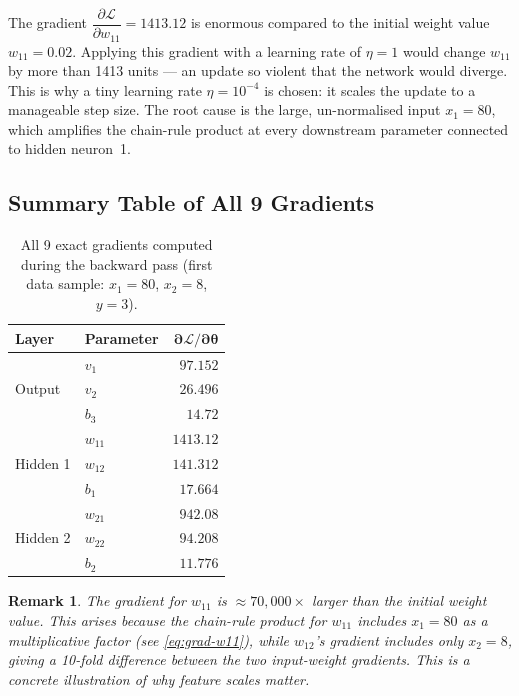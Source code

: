 \documentclass[12pt,a4paper]{article}
\newtheorem{remark}{Remark}[section]
\newcommand{\Loss}{\mathcal{L}}
\newcommand{\pderiv}[2]{\dfrac{\partial #1}{\partial #2}}
\begin{document}
\begin{warningbox}
The gradient $\pderiv{\Loss}{w_{11}} = 1413.12$ is enormous compared to the
initial weight value $w_{11}=0.02$.  Applying this gradient with a learning
rate of $\eta = 1$ would change $w_{11}$ by more than 1413 units --- an
update so violent that the network would diverge.
This is why a tiny learning rate $\eta = 10^{-4}$ is chosen: it scales the
update to a manageable step size.
The root cause is the large, un-normalised input $x_1 = 80$, which amplifies
the chain-rule product at every downstream parameter connected to hidden
neuron~1.
\end{warningbox}

\subsection{Summary Table of All 9 Gradients}
\label{sec:grad-table}

\begin{table}[ht]
\centering
\caption{All 9 exact gradients computed during the backward pass
         (first data sample: $x_1=80$, $x_2=8$, $y=3$).}
\label{tab:gradients}
\begin{tabular}{llr}
\toprule
\textbf{Layer} & \textbf{Parameter} & $\boldsymbol{\partial\Loss/\partial\theta}$ \\
\midrule
\multirow{3}{*}{Output}
  & $v_1$  & $97.152$  \\
  & $v_2$  & $26.496$  \\
  & $b_3$  & $14.72$   \\
\midrule
\multirow{3}{*}{Hidden 1}
  & $w_{11}$ & $1413.12$  \\
  & $w_{12}$ & $141.312$  \\
  & $b_1$    & $17.664$   \\
\midrule
\multirow{3}{*}{Hidden 2}
  & $w_{21}$ & $942.08$  \\
  & $w_{22}$ & $94.208$  \\
  & $b_2$    & $11.776$  \\
\bottomrule
\end{tabular}
\end{table}

\begin{remark}
\label{rem:large-grad}
The gradient for $w_{11}$ is $\approx 70{,}000\times$ larger than the
initial weight value.  This arises because the chain-rule product for
$w_{11}$ includes $x_1 = 80$ as a multiplicative factor
(see \cref{eq:grad-w11}), while $w_{12}$'s gradient includes only
$x_2 = 8$, giving a 10-fold difference between the two input-weight
gradients.  This is a concrete illustration of why feature scales
matter.
\end{remark}
\end{document}
